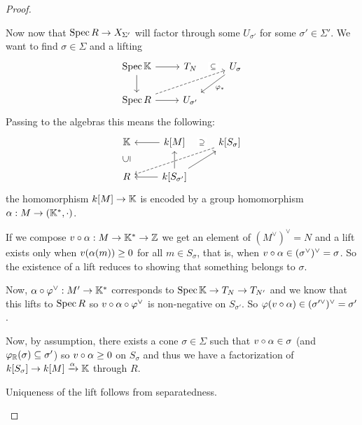 \begin{proof}
\begin{itemize}
Now now that $\operatorname{Spec} R\to X_{\Sigma'}$ will factor through some $U_{\sigma'}$ for some $\sigma'\in \Sigma'$. We want to find $\sigma\in \Sigma$ and a lifting
\[\begin{tikzcd}
	{\Spec \K} & {T_N} & {U_{\sigma}} \\
	{\Spec R} & {U_{\sigma'}}
	\arrow[from=1-1, to=1-2]
	\arrow[from=1-1, to=2-1]
	\arrow["\subseteq"{description}, draw=none, from=1-2, to=1-3]
	\arrow["{\vp_\ast}", from=1-3, to=2-2]
	\arrow[dashed, from=2-1, to=1-3]
	\arrow[from=2-1, to=2-2]
\end{tikzcd}\]
Passing to the algebras this means the following:
\[\begin{tikzcd}
	\K & {k[M]} & {k[S_{\sigma}]} \\
	R & {k[S_{\sigma'}]}
	\arrow[from=1-2, to=1-1]
	\arrow["\supseteq"{description}, draw=none, from=1-3, to=1-2]
	\arrow[dashed, from=1-3, to=2-1]
	\arrow["\subseteq"{marking, allow upside down}, draw=none, from=2-1, to=1-1]
	\arrow[from=2-2, to=1-2]
	\arrow[from=2-2, to=1-3]
	\arrow[from=2-2, to=2-1]
\end{tikzcd}\]
the homomorphism $k[M]\to \mathbb{K}$ is encoded by a group homomorphism $\alpha:M\to(\mathbb{K}^\ast,\cdot)$. 

If we compose $v\circ \alpha:M\to \mathbb{K}^\ast\to \mathbb{Z}$ we get an element of $(M^\vee)^\vee=N$ and a lift exists only when $v(\alpha(m))\geq 0$ for all $m\in S_\sigma$, that is, when $v\circ \alpha\in (\sigma^\vee)^\vee=\sigma$. So the existence of a lift reduces to showing that something belongs to $\sigma$.

Now, $\alpha\circ \varphi^\vee:M'\to \mathbb{K}^\ast$ corresponds to $\operatorname{Spec} \mathbb{K}\to T_N\to T_{N'}$ and we know that this lifts to $\operatorname{Spec} R$ so $v\circ \alpha\circ \varphi^\vee$ is non-negative on $S_{\sigma'}$. So $\varphi(v\circ \alpha)\in (\sigma'^\vee)^\vee=\sigma'$.

Now, by assumption, there exists a cone $\sigma\in \Sigma$ such that $v\circ \alpha\in \sigma$ (and $\varphi_{\mathbb{R}}(\sigma)\subseteq \sigma'$) so $v\circ \alpha\geq 0$ on $S_\sigma$ and thus we have a factorization of $k[S_\sigma]\to k[M]\xrightarrow{\alpha}\mathbb{K}$ through $R$.



Uniqueness of the lift follows from separatedness.
\end{itemize}
\setlength{\leftmargini}{0.5cm}
\end{proof}



